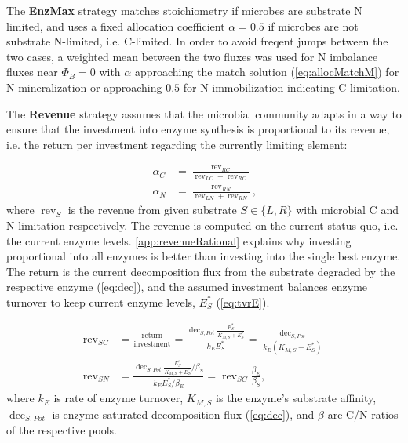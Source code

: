 The \textbf{EnzMax} strategy \citep{Averill14} matches stoichiometry if microbes
are substrate N limited, and uses a fixed allocation coefficient $\alpha = 0.5$
if microbes are not substrate N-limited, i.e. C-limited. In order to avoid
freqent jumps between the two cases, a weighted mean between the two fluxes was
used for N imbalance fluxes near $\Phi_B=0$ with $\alpha$ approaching
the match solution (\ref{eq:allocMatchM}) for N mineralization or approaching $0.5$
for N immobilization indicating C limitation.

The \textbf{Revenue} strategy assumes that the microbial community adapts in a
way to ensure that the investment into enzyme synthesis is proportional to its
revenue, i.e.
the return per investment regarding the currently limiting element:

\begin{subequations}
\label{eq:allocRev}
\begin{align}
\alpha_C &= \frac{\operatorname{rev}_{RC}}{\operatorname{rev}_{LC} + \operatorname{rev}_{RC}} 
\\
\alpha_N &= \frac{\operatorname{rev}_{RN}}{\operatorname{rev}_{LN} + \operatorname{rev}_{RN}} 
\text{,} 
\end{align}
\end{subequations}
\noindent where $\operatorname{rev}_S$ is the revenue from given substrate $S \in \{L,R\}$
with microbial C and N limitation respectively. The revenue is computed on the
current status quo, i.e. the current enzyme levels. 
\ref{app:revenueRational} explains why investing proportional into all enzymes
is better than investing into the single best enzyme. The return is the current
decomposition flux from the substrate degraded by the respective enzyme
(\ref{eq:dec}), and the assumed investment balances enzyme turnover to keep
current enzyme levels, $E_S^*$ (\ref{eq:tvrE}).

\begin{subequations}
\label{eq:allocRev2}
\begin{align}
\operatorname{rev}_{SC} &= \frac{\text{return}}{\text{investment}} 
= \frac{\operatorname{dec}_{S,Pot} \frac{E_S^*}{K_{M,S} + E_S^*}} {k_{E}E_S^*} 
= \frac{\operatorname{dec}_{S,Pot}} {k_{E}(K_{M,S} + E_S^*)} 
\\ 
\operatorname{rev}_{SN} &= \frac{\operatorname{dec}_{S,Pot}
\frac{E_S^*}{K_{M,S} + E_S^*} / \beta_S} {k_{E} E_S^* / \beta_E} 
= \operatorname{rev}_{SC} \frac{\beta_E}{\beta_S}
\text{,} 
\end{align}
\end{subequations} 
\noindent where $k_{E}$ is rate of enzyme turnover, $K_{M,S}$ is the enzyme's
substrate affinity, $\operatorname{dec}_{S,Pot}$ is
enzyme saturated decomposition flux (\ref{eq:dec}), and $\beta$ are C/N ratios
of the respective pools. 

